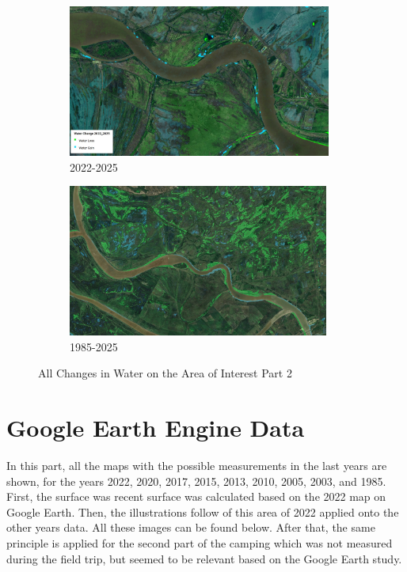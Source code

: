 \begin{figure}[H]
    \begin{subfigure}[b]{0.48\textwidth}
        \includegraphics[width=\linewidth, height =5cm]{figures/appendix-g/2022-2025.jpg}
        \caption{2022-2025}
        \label{fig:second}
    \end{subfigure}
    \hfill
    \begin{subfigure}[b]{0.48\textwidth}
        \includegraphics[width=\linewidth, height =5cm]{figures/ch4/1985-2025.jpg}
        \caption{1985-2025}
        \label{fig:second}
    \end{subfigure}

    \caption{All Changes in Water on the Area of Interest Part 2}
    \label{fig:All Changes in Water on the Area of Interest Part 2}
\end{figure}

\newpage
\section{Google Earth Engine Data}
In this part, all the maps with the possible measurements in the last years are shown, for the years 2022, 2020, 2017, 2015, 2013, 2010, 2005, 2003, and 1985.
First, the surface was recent surface was calculated based on the 2022 map on Google Earth. Then, the illustrations follow of this area of 2022 applied onto the other years data. All these images can be found below. After that, the same principle is applied for the second part of the camping which was not measured during the field trip, but seemed to be relevant based on the Google Earth study.

